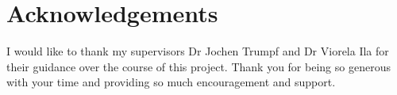 \chapter*{Acknowledgements}

I would like to thank my supervisors Dr Jochen Trumpf and Dr Viorela Ila for their guidance over the course of this project. Thank you for being so generous with your time and providing so much encouragement and support.

